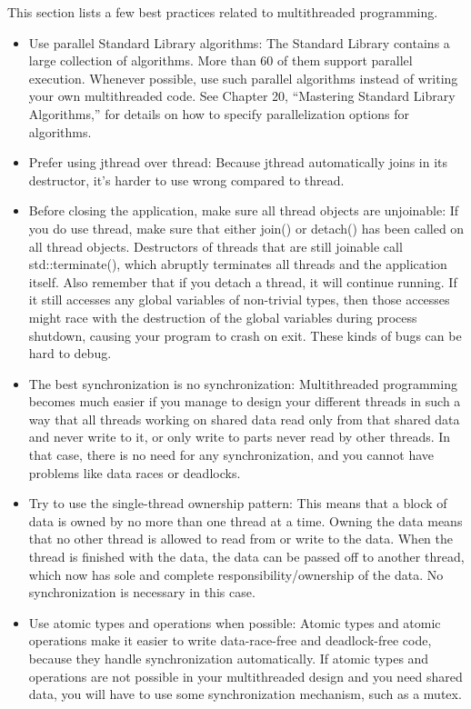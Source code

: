 This section lists a few best practices related to multithreaded programming.

\begin{itemize}
\item
Use parallel Standard Library algorithms: The Standard Library contains a large collection of algorithms. More than 60 of them support parallel execution. Whenever possible, use such parallel algorithms instead of writing your own multithreaded code. See Chapter 20, “Mastering Standard Library Algorithms,” for details on how to specify parallelization options for algorithms.

\item
Prefer using jthread over thread: Because jthread automatically joins in its destructor, it’s harder to use wrong compared to thread.

\item
Before closing the application, make sure all thread objects are unjoinable: If you do use thread, make sure that either join() or detach() has been called on all thread objects. Destructors of threads that are still joinable call std::terminate(), which abruptly terminates all threads and the application itself. Also remember that if you detach a thread, it will continue running. If it still accesses any global variables of non-trivial types, then those accesses might race with the destruction of the global variables during process shutdown, causing your program to crash on exit. These kinds of bugs can be hard to debug.

\item
The best synchronization is no synchronization: Multithreaded programming becomes much easier if you manage to design your different threads in such a way that all threads working on shared data read only from that shared data and never write to it, or only write to parts never read by other threads. In that case, there is no need for any synchronization, and you cannot have problems like data races or deadlocks.

\item
Try to use the single-thread ownership pattern: This means that a block of data is owned by no more than one thread at a time. Owning the data means that no other thread is allowed to read from or write to the data. When the thread is finished with the data, the data can be passed off to another thread, which now has sole and complete responsibility/ownership of the data. No synchronization is necessary in this case.

\item
Use atomic types and operations when possible: Atomic types and atomic operations make it easier to write data-race-free and deadlock-free code, because they handle synchronization automatically. If atomic types and operations are not possible in your multithreaded design and you need shared data, you will have to use some synchronization mechanism, such as a mutex.


\end{itemize}

